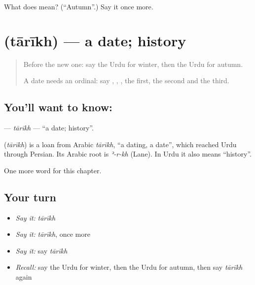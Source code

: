 \begin{tcolorbox}[breakable,colback=teal!4,colframe=teal!35!black,title={Before you move on}]
What does  mean? (\textquotedblleft{}Autumn\textquotedblright{}.) Say it once more.
\end{tcolorbox}
\section[\texorpdfstring{\ur{تاریخ} (tārīkh)}{تاریخ (tārīkh)}]{ (tārīkh) — a date; history}

\label{lesson:UR-C95-tarikh}



\begin{quote}
Before the new one: say the Urdu for winter, then the Urdu for autumn.

A date needs an ordinal: say \textbf{}, \textbf{}, \textbf{}, the first, the second and the third.
\end{quote}

\subsection*{You'll want to know: }
\textbf{} — \emph{tārīkh} — \textquotedblleft{}a date; history\textquotedblright{}.

\begin{cousinweb}
\textbf{} (\emph{tārīkh}) is a loan from Arabic \emph{tārīkh}, \textquotedblleft{}a dating, a date\textquotedblright{}, which reached Urdu through Persian. Its Arabic root is \emph{ʾ-r-kh} (Lane). In Urdu it also means \textquotedblleft{}history\textquotedblright{}.
\end{cousinweb}

\begin{grammarlens}[title={What you've built}]
One more word for this chapter.
\end{grammarlens}

\subsection*{Your turn}
\begin{itemize}
\raggedright
  \item \emph{Say it:} \emph{tārīkh}
  \item \emph{Say it:} \emph{tārīkh}, once more
  \item \emph{Say it:} say \emph{tārīkh}
  \item \emph{Recall:} say the Urdu for winter, then the Urdu for autumn, then say \emph{tārīkh} again
\end{itemize}

